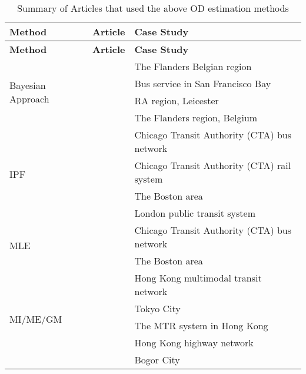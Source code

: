 \documentclass[11pt,twoside]{article}
\numberwithin{equation}{section}
\newcommand{\?}{\stackrel{?}{=}}
\begin{document}
\begin{longtable}[c]{l|l|l} 
  \caption{Summary of Articles that used the above OD estimation methods}
  \label{tab:table1}\\
  \toprule
  \textbf{Method} & \textbf{Article} & \textbf{Case Study}\\

  \midrule
  \endfirsthead 
  \toprule
  \textbf{Method} & \textbf{Article} & \textbf{Case Study}\\

  \midrule
  \endhead 


      \multirow{4}{*}{Bayesian Approach}  &  \citep{zhuAgentBasedRouteChoice2018} & The Flanders Belgian region\\
      & \citep{hazeltonStatisticalInferenceTransit2010} & Bus service in San Francisco Bay\\
      & \citep{liBayesianInferenceOriginDestination2005} & RA region, Leicester \\
      &  \citep{perrakisBayesianApproachModeling2012}& The Flanders region, Belgium\\
      
      
      
      \midrule

      \multirow{4}{*}{IPF}  & \citep{cuiBusPassengerOriginDestination2006} & Chicago Transit Authority (CTA) bus network\\
      & \citep{zhaoEstimatingRailPassenger2007} & Chicago Transit Authority (CTA) rail system\\
      & \citep{navickDistanceBasedModelEstimating1994} &  The Boston area\\
      & \citep{gordonIntermodalPassengerFlows2012}&  London public transit system\\
      
      
      
      \midrule

      \multirow{2}{*}{MLE}  &  \citep{cuiBusPassengerOriginDestination2006} & Chicago Transit Authority (CTA) bus network\\
      & \citep{navickDistanceBasedModelEstimating1994} & The Boston area\\


      \midrule

      \multirow{5}{*}{MI/ME/GM}  & \citep{wongEstimationOrigindestinationMatrices2005} & Hong Kong multimodal transit network\\
      & \citep{geUpdatingOriginDestination2016} & Tokyo City\\
      & \citep{tongSchedulebasedDynamicTransit2001} & The MTR system in Hong Kong\\
      & \citep{wongESTIMATIONMULTICLASSORIGINDESTINATION2005} & Hong Kong highway network\\
      & \citep{ekowicaksonoEstimatingOriginDestinationMatrix2016} & Bogor City\\


\end{longtable}
\end{document}
